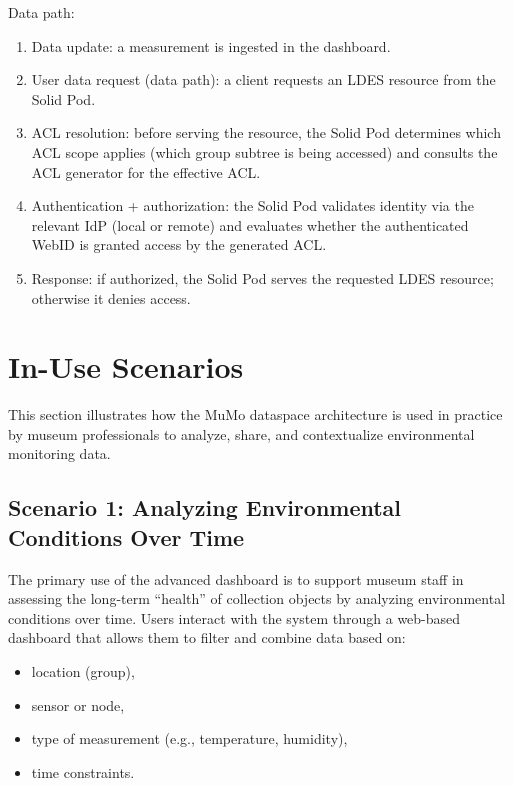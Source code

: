 Data path:

\begin{enumerate}
\def\labelenumi{\arabic{enumi}.}
\tightlist
\item
  Data update: a measurement is ingested in the dashboard.
\item
  User data request (data path): a client requests an LDES resource from
  the Solid Pod.
\item
  ACL resolution: before serving the resource, the Solid Pod determines
  which ACL scope applies (which group subtree is being accessed) and
  consults the ACL generator for the effective ACL.
\item
  Authentication + authorization: the Solid Pod validates identity via
  the relevant IdP (local or remote) and evaluates whether the
  authenticated WebID is granted access by the generated ACL.
\item
  Response: if authorized, the Solid Pod serves the requested LDES
  resource; otherwise it denies access.
\end{enumerate}

\section{In-Use Scenarios}\label{sec:scenarios}

This section illustrates how the MuMo dataspace architecture is used in
practice by museum professionals to analyze, share, and contextualize
environmental monitoring data.

\subsection{Scenario 1: Analyzing Environmental Conditions Over
Time}\label{scenario-1-analyzing-environmental-conditions-over-time}

The primary use of the advanced dashboard is to support museum staff in
assessing the long-term ``health'' of collection objects by analyzing
environmental conditions over time. Users interact with the system
through a web-based dashboard that allows them to filter and combine
data based on:

\begin{itemize}
\tightlist
\item
  location (group),
\item
  sensor or node,
\item
  type of measurement (e.g., temperature, humidity),
\item
  time constraints.
\end{itemize}

